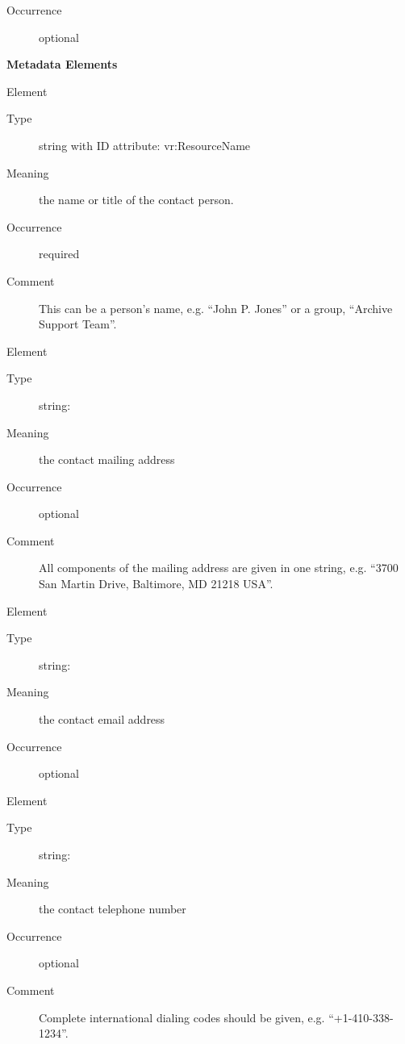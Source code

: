 \documentclass[11pt,a4paper]{ivoa}
\begin{document}
\begin{generated}
\begin{bigdescription}
\begin{description}
\item[Occurrence] optional

\end{description}


\end{bigdescription}\endgroup



\vspace{0.5ex}\noindent\textbf{ Metadata Elements}

\begingroup\small\begin{bigdescription}\item[Element \xmlel{name}]
\begin{description}
\item[Type] string with ID attribute: vr:ResourceName
\item[Meaning] 
                  the name or title of the contact person.
              
\item[Occurrence] required
\item[Comment] 
                  This can be a person's name, e.g. “John P. Jones” or
                  a group, “Archive Support Team”.
              

\end{description}
\item[Element \xmlel{address}]
\begin{description}
\item[Type] string: 
\item[Meaning] the contact mailing address
\item[Occurrence] optional
\item[Comment] 
                All components of the mailing address are given in one
                string, e.g. “3700 San Martin Drive, Baltimore, MD 21218 USA”.
              

\end{description}
\item[Element \xmlel{email}]
\begin{description}
\item[Type] string: 
\item[Meaning] the contact email address
\item[Occurrence] optional

\end{description}
\item[Element \xmlel{telephone}]
\begin{description}
\item[Type] string: 
\item[Meaning] the contact telephone number
\item[Occurrence] optional
\item[Comment] 
                Complete international dialing codes should be given, e.g.
                “+1-410-338-1234”.
              


\end{description}
\end{bigdescription}
\end{generated}
\end{document}
